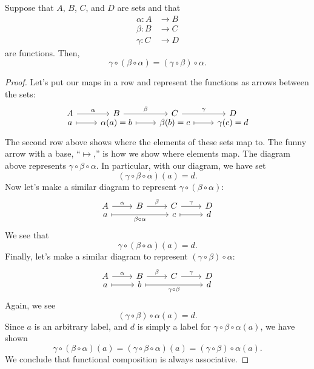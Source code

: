 \documentclass{ximera}
\begin{document}
\begin{lemma}\label{L:funCompAss}
  Suppose that $A$, $B$, $C$, and $D$ are sets and that
  \begin{align*}
    \alpha:A &\to B\\
    \beta:B &\to C\\
    \gamma:C &\to D
  \end{align*}
  are functions. Then,
  \[
  \gamma\circ(\beta\circ\alpha) = (\gamma\circ\beta)\circ\alpha.
  \]
  \begin{proof}
    Let's put our maps in a row and represent the functions as arrows
    between the sets:
    \[
    \begin{tikzcd}[row sep=-1ex]%
      A \ar[r,"\alpha"] & B \ar[r,"\beta"] & C \ar[r,"\gamma"] & D\\
      a \ar[mapsto,r] & \alpha(a) = b  \ar[mapsto,r] & \beta(b) = c  \ar[mapsto,r] & \gamma(c)=d 
    \end{tikzcd}
    \]
    The second row above shows where the elements of these sets map
    to. The funny arrow with a base, ``$\mapsto$,'' is how we show
    where elements map. The diagram above represents
    $\gamma\circ\beta\circ\alpha$. In particular, with our diagram, we have set
    \[
    (\gamma\circ\beta\circ\alpha)(a) = d.
    \]
    Now let's make a similar diagram to
    represent $\gamma\circ(\beta\circ\alpha)$:
    \[
    \begin{tikzcd}[row sep=-1ex]%
      A \ar[r,"\alpha"] & B \ar[r,"\beta"] & C \ar[r,"\gamma"] & D\\
      a \ar[mapsto,rr,"\beta\circ\alpha",swap] &  & c  \ar[mapsto,r] & d 
    \end{tikzcd}
    \]
    We see that
    \[
    \gamma\circ(\beta\circ\alpha)(a) = d.
    \]
    Finally, let's make a similar diagram to
    represent $(\gamma\circ\beta)\circ\alpha$:
    \[
    \begin{tikzcd}[row sep=-1ex]%
      A \ar[r,"\alpha"] & B \ar[r,"\beta"] & C \ar[r,"\gamma"] & D\\
      a \ar[mapsto,r] & b \ar[rr,mapsto,"\gamma\circ\beta",swap] &   & d 
    \end{tikzcd}
    \]
    Again, we see
    \[
    (\gamma\circ\beta)\circ\alpha(a) = d.
    \]
    Since $a$ is an arbitrary label, and $d$ is simply a label for
    $\gamma\circ\beta\circ\alpha(a)$, we have shown
    \[
    \gamma\circ(\beta\circ\alpha)(a) = (\gamma\circ\beta\circ\alpha)(a) = (\gamma\circ\beta)\circ\alpha(a).
    \]
    We conclude that functional composition is always associative.
  \end{proof}
\end{lemma}
\end{document}
